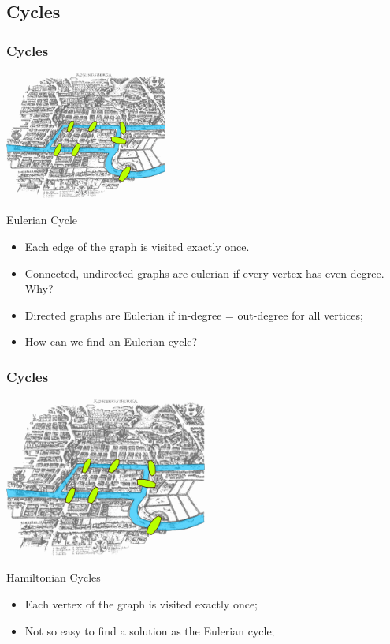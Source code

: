 \documentclass{beamer}
\begin{document}
\subsection{Cycles}

\begin{frame}
  \frametitle{Cycles}
  \begin{center}
    \includegraphics[width=0.4\textwidth]{img/eulerian}
  \end{center}
  {\small
  \begin{block}{Eulerian Cycle}
    \begin{itemize}
    \item Each edge of the graph is visited exactly once.
    \item Connected, undirected graphs are eulerian if every vertex
      has even degree. Why?
    \item Directed graphs are Eulerian if in-degree = out-degree for
      all vertices;
    \item How can we find an Eulerian cycle?
    \end{itemize}
  \end{block}}
\end{frame}

\begin{frame}
  \frametitle{Cycles}
  \begin{center}
    \includegraphics[width=0.5\textwidth]{img/eulerian}
  \end{center}
  {\small
    \begin{block}{Hamiltonian Cycles}
      \begin{itemize}
      \item Each vertex of the graph is visited exactly once;
      \item Not so easy to find a solution as the Eulerian cycle;
      \end{itemize}
    \end{block}
  }
\end{frame}
\end{document}
